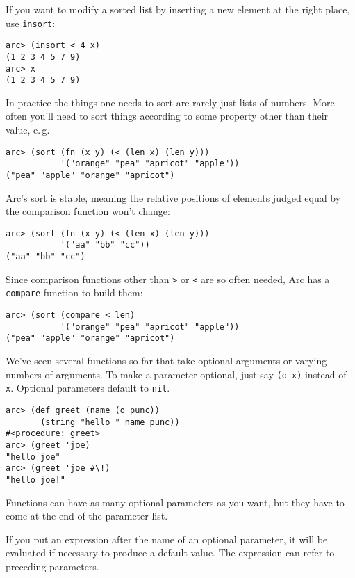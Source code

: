 \documentclass[a4paper,12pt]{book}
\begin{document}
If you want to modify a sorted list by inserting a new element
at the right place, use \verb|insort|:

\begin{verbatim}
arc> (insort < 4 x)
(1 2 3 4 5 7 9)
arc> x
(1 2 3 4 5 7 9)
\end{verbatim}

In practice the things one needs to sort are rarely just lists of
numbers.  More often you'll need to sort things according to some
property other than their value, e.\,g.

\begin{verbatim}
arc> (sort (fn (x y) (< (len x) (len y)))
           '("orange" "pea" "apricot" "apple"))
("pea" "apple" "orange" "apricot")
\end{verbatim}

{\sc{}Arc}'s sort is stable, meaning the relative positions of elements
judged equal by the comparison function won't change:

\begin{verbatim}
arc> (sort (fn (x y) (< (len x) (len y)))
           '("aa" "bb" "cc"))
("aa" "bb" "cc")
\end{verbatim}

Since comparison functions other than {\tt>} or {\tt<} are so often needed,
{\sc{}Arc} has a \verb|compare| function to build them:

\begin{verbatim}
arc> (sort (compare < len)
           '("orange" "pea" "apricot" "apple"))
("pea" "apple" "orange" "apricot")
\end{verbatim}

We've seen several functions so far that take optional arguments
or varying numbers of arguments.  To make a parameter optional,
just say \verb|(o x)| instead of {\tt{}x}. Optional parameters default to \verb|nil|.

\begin{verbatim}
arc> (def greet (name (o punc))
       (string "hello " name punc))
#<procedure: greet>
arc> (greet 'joe)
"hello joe"
arc> (greet 'joe #\!)
"hello joe!"
\end{verbatim}

Functions can have as many optional parameters as you want, but
they have to come at the end of the parameter list.  

If you put an expression after the name of an optional parameter,
it will be evaluated if necessary to produce a default value.  The
expression can refer to preceding parameters.
\end{document}
